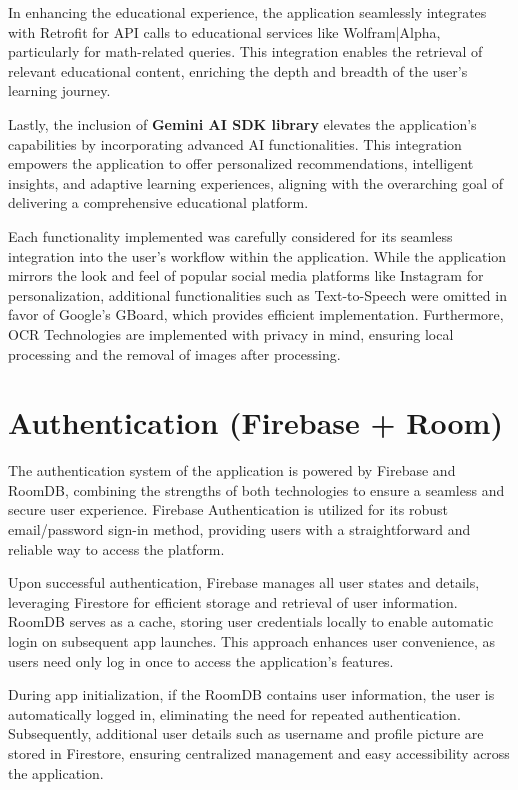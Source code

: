 In enhancing the educational experience, the application seamlessly integrates with Retrofit for API calls to educational services like Wolfram|Alpha, particularly for math-related queries. This integration enables the retrieval of relevant educational content, enriching the depth and breadth of the user's learning journey.

Lastly, the inclusion of \textbf{Gemini AI SDK library} elevates the application's capabilities by incorporating advanced AI functionalities. This integration empowers the application to offer personalized recommendations, intelligent insights, and adaptive learning experiences, aligning with the overarching goal of delivering a comprehensive educational platform.

Each functionality implemented was carefully considered for its seamless integration into the user's workflow within the application. While the application mirrors the look and feel of popular social media platforms like Instagram for personalization, additional functionalities such as Text-to-Speech were omitted in favor of Google's GBoard, which provides efficient implementation. Furthermore, OCR Technologies are implemented with privacy in mind, ensuring local processing and the removal of images after processing.


\section{Authentication (Firebase + Room)}
The authentication system of the application is powered by Firebase and RoomDB, combining the strengths of both technologies to ensure a seamless and secure user experience. Firebase Authentication is utilized for its robust email/password sign-in method, providing users with a straightforward and reliable way to access the platform.

Upon successful authentication, Firebase manages all user states and details, leveraging Firestore for efficient storage and retrieval of user information. RoomDB serves as a cache, storing user credentials locally to enable automatic login on subsequent app launches. This approach enhances user convenience, as users need only log in once to access the application's features.

During app initialization, if the RoomDB contains user information, the user is automatically logged in, eliminating the need for repeated authentication. Subsequently, additional user details such as username and profile picture are stored in Firestore, ensuring centralized management and easy accessibility across the application.

